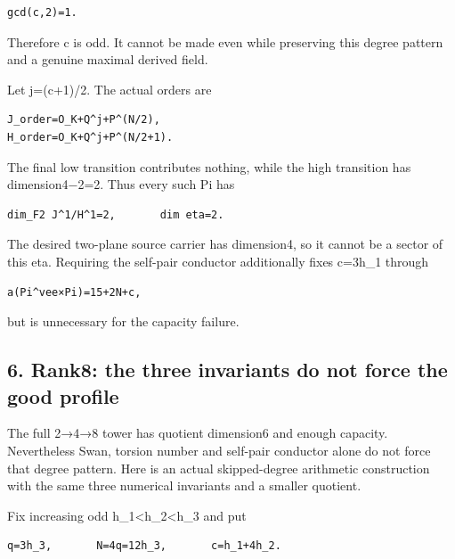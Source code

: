 \begin{Verbatim}[fontsize=\small,breaklines=true,breakanywhere=true]
gcd(c,2)=1.
\end{Verbatim}

Therefore c is odd. It cannot be made even while preserving this degree
pattern and a genuine maximal derived field.

Let j=(c+1)/2. The actual orders are

\begin{Verbatim}[fontsize=\small,breaklines=true,breakanywhere=true]
J_order=O_K+Q^j+P^(N/2),
H_order=O_K+Q^j+P^(N/2+1).
\end{Verbatim}

The final low transition contributes nothing, while the high transition
has dimension4−2=2. Thus every such Pi has

\begin{Verbatim}[fontsize=\small,breaklines=true,breakanywhere=true]
dim_F2 J^1/H^1=2,       dim eta=2.
\end{Verbatim}

The desired two-plane source carrier has dimension4, so it cannot be a
sector of this eta. Requiring the self-pair conductor additionally fixes
c=3h\_1 through

\begin{Verbatim}[fontsize=\small,breaklines=true,breakanywhere=true]
a(Pi^vee×Pi)=15+2N+c,
\end{Verbatim}

but is unnecessary for the capacity failure.

\hypertarget{dyadic_capacity-rank8-the-three-invariants-do-not-force-the-good-profile}{%
\subsection{6. Rank8: the three invariants do not force the good
profile}\label{dyadic_capacity-rank8-the-three-invariants-do-not-force-the-good-profile}}

The full 2→4→8 tower has quotient dimension6 and enough capacity.
Nevertheless Swan, torsion number and self-pair conductor alone do not
force that degree pattern. Here is an actual skipped-degree arithmetic
construction with the same three numerical invariants and a smaller
quotient.

Fix increasing odd h\_1\textless h\_2\textless h\_3 and put

\begin{Verbatim}[fontsize=\small,breaklines=true,breakanywhere=true]
q=3h_3,       N=4q=12h_3,       c=h_1+4h_2.
\end{Verbatim}

